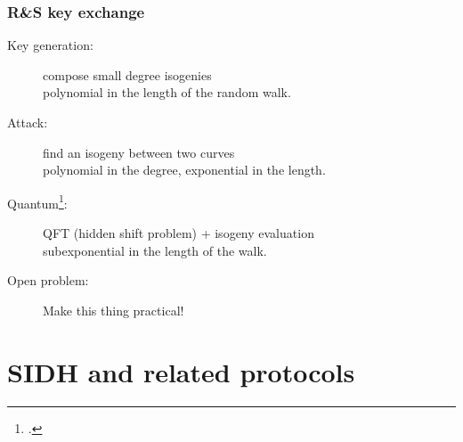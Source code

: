 \documentclass{beamer}
\begin{document}
\begin{frame}
  \frametitle{R\&S key exchange}

  \begin{center}
  \end{center}

  \begin{description}
  \item[Key generation:] compose small degree
    isogenies\\\alert{polynomial in the length of the random walk}.
  \item[Attack:] find an isogeny between two curves\\\alert{polynomial
      in the degree, exponential in the length}.
  \item[Quantum\footcite{childs+jao+soukharev10}:] QFT (hidden shift
    problem) + isogeny evaluation\\\alert{subexponential in the length
      of the walk}.
  \item[Open problem:] Make this thing practical!
  \end{description}
\end{frame}

\section{SIDH and related protocols}
\end{document}
